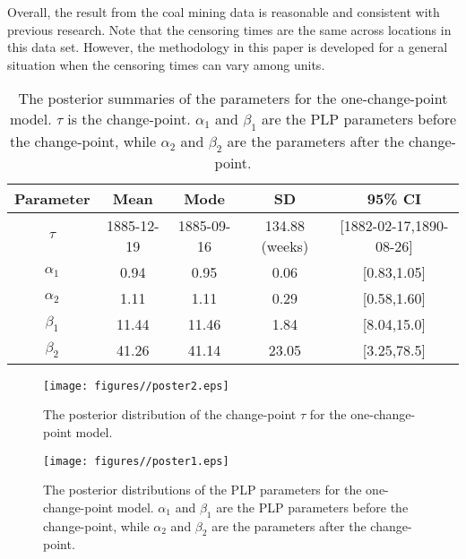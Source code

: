 \documentclass[12pt]{article}
\numberwithin{equation}{section}
\begin{document}
Overall, the result from the coal mining data is reasonable and consistent with previous research. Note that the censoring times are the same across locations in this data set. However, the methodology in this paper is developed for a general situation when the censoring times can vary among units.
\begin{table}[htbp] 
	\centering
	\caption{The posterior summaries of the parameters for the one-change-point model. $\tau$ is the change-point.  $\alpha_1$ and $\beta_1$ are 
			the PLP parameters before the change-point, while $\alpha_2$ and $\beta_2$ are the parameters after the change-point.}
	\begin{tabular}{ccccc}
		\hline
		Parameter & Mean & Mode & SD & 95\% CI \\
		\hline
		$\tau$   & 1885-12-19 & 1885-09-16 & 134.88 (weeks) & [1882-02-17,1890-08-26] \\
		$\alpha_1$ & 0.94	& 0.95 &	0.06  & [0.83,1.05] \\
		$\alpha_2$ & 1.11	& 1.11	& 0.29  & [0.58,1.60] \\
		$\beta_1$ & 11.44	& 11.46 &	1.84 & [8.04,15.0] \\
	$	\beta_2$ & 41.26	& 41.14 &	23.05 & [3.25,78.5] \\
		\hline
	\end{tabular}%
	\label{tab:esti}%
\end{table}%
 \begin{figure}
  
   \centering
     \texttt{[image: figures//poster2.eps]}    
      \caption{The posterior distribution of the change-point $\tau$ for the one-change-point model.}
      \label{fig:poster2}
 \end{figure}
  \begin{figure}

    \centering
      \texttt{[image: figures//poster1.eps]}
          \caption{The posterior distributions of the PLP parameters for the one-change-point model. $\alpha_1$ and $\beta_1$ are 
          			the PLP parameters before the change-point, while $\alpha_2$ and $\beta_2$ are the parameters after the change-point.}
          			\label{fig:poster1}
  \end{figure}
%  
 
\end{document}
